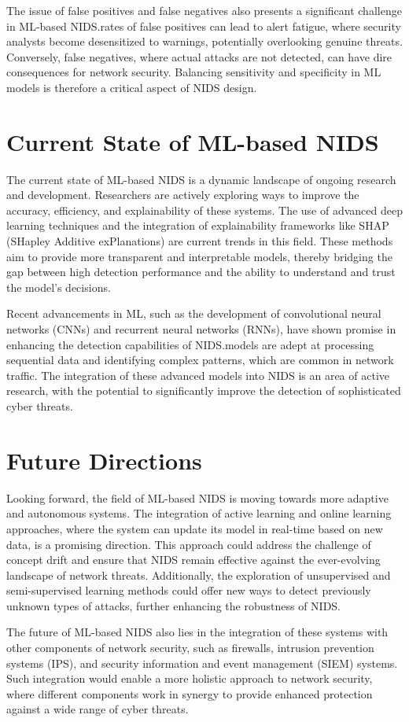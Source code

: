The issue of false positives and false negatives also presents a significant challenge in ML-based NIDS.\@High rates of false positives can lead to alert fatigue, where security analysts become desensitized to warnings, potentially overlooking genuine threats. Conversely, false negatives, where actual attacks are not detected, can have dire consequences for network security. Balancing sensitivity and specificity in ML models is therefore a critical aspect of NIDS design.

\section{Current State of ML-based NIDS}
The current state of ML-based NIDS is a dynamic landscape of ongoing research and development. Researchers are actively exploring ways to improve the accuracy, efficiency, and explainability of these systems. The use of advanced deep learning techniques and the integration of explainability frameworks like SHAP (SHapley Additive exPlanations) are current trends in this field. These methods aim to provide more transparent and interpretable models, thereby bridging the gap between high detection performance and the ability to understand and trust the model's decisions.

Recent advancements in ML, such as the development of convolutional neural networks (CNNs) and recurrent neural networks (RNNs), have shown promise in enhancing the detection capabilities of NIDS.\@These models are adept at processing sequential data and identifying complex patterns, which are common in network traffic. The integration of these advanced models into NIDS is an area of active research, with the potential to significantly improve the detection of sophisticated cyber threats.

\section{Future Directions}
Looking forward, the field of ML-based NIDS is moving towards more adaptive and autonomous systems. The integration of active learning and online learning approaches, where the system can update its model in real-time based on new data, is a promising direction. This approach could address the challenge of concept drift and ensure that NIDS remain effective against the ever-evolving landscape of network threats. Additionally, the exploration of unsupervised and semi-supervised learning methods could offer new ways to detect previously unknown types of attacks, further enhancing the robustness of NIDS.\@

The future of ML-based NIDS also lies in the integration of these systems with other components of network security, such as firewalls, intrusion prevention systems (IPS), and security information and event management (SIEM) systems. Such integration would enable a more holistic approach to network security, where different components work in synergy to provide enhanced protection against a wide range of cyber threats.